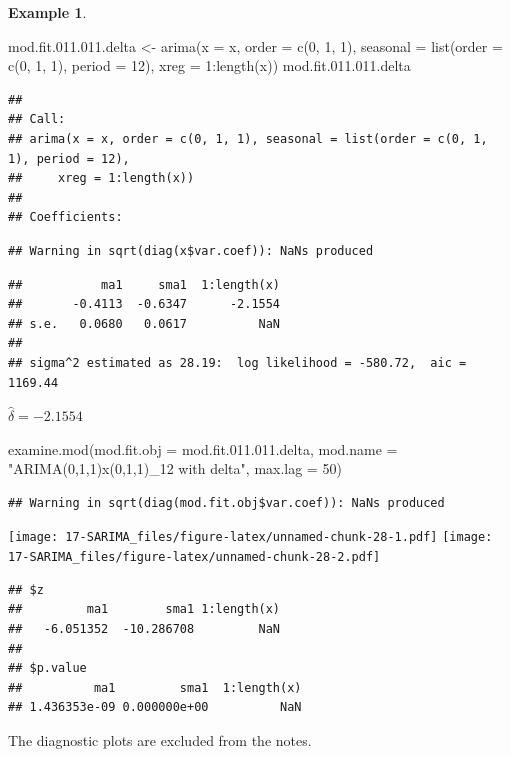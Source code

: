 \documentclass[
]{book}
\newenvironment{Shaded}{\begin{snugshade}}{\end{snugshade}}
\newcommand{\AttributeTok}[1]{\textcolor[rgb]{0.77,0.63,0.00}{#1}}
\newcommand{\DecValTok}[1]{\textcolor[rgb]{0.00,0.00,0.81}{#1}}
\newcommand{\FloatTok}[1]{\textcolor[rgb]{0.00,0.00,0.81}{#1}}
\newcommand{\FunctionTok}[1]{\textcolor[rgb]{0.00,0.00,0.00}{#1}}
\newcommand{\NormalTok}[1]{#1}
\newcommand{\OtherTok}[1]{\textcolor[rgb]{0.56,0.35,0.01}{#1}}
\newcommand{\SpecialCharTok}[1]{\textcolor[rgb]{0.00,0.00,0.00}{#1}}
\newcommand{\StringTok}[1]{\textcolor[rgb]{0.31,0.60,0.02}{#1}}
\theoremstyle{definition}
\theoremstyle{definition}
\newtheorem{example}{Example}[chapter]
\theoremstyle{definition}
\theoremstyle{definition}
\theoremstyle{remark}
\begin{document}
\begin{example}
\begin{Shaded}
\begin{Highlighting}[]
\NormalTok{mod.fit.}\DecValTok{011}\NormalTok{.}\FloatTok{011.}\NormalTok{delta }\OtherTok{\textless{}{-}} \FunctionTok{arima}\NormalTok{(}\AttributeTok{x =}\NormalTok{ x, }\AttributeTok{order =} \FunctionTok{c}\NormalTok{(}\DecValTok{0}\NormalTok{, }\DecValTok{1}\NormalTok{, }\DecValTok{1}\NormalTok{), }
   \AttributeTok{seasonal =} \FunctionTok{list}\NormalTok{(}\AttributeTok{order =} \FunctionTok{c}\NormalTok{(}\DecValTok{0}\NormalTok{, }\DecValTok{1}\NormalTok{, }\DecValTok{1}\NormalTok{), }\AttributeTok{period =} \DecValTok{12}\NormalTok{), }
   \AttributeTok{xreg =} \DecValTok{1}\SpecialCharTok{:}\FunctionTok{length}\NormalTok{(x))}
\NormalTok{mod.fit.}\DecValTok{011}\NormalTok{.}\FloatTok{011.}\NormalTok{delta }
\end{Highlighting}
\end{Shaded}

\begin{verbatim}
## 
## Call:
## arima(x = x, order = c(0, 1, 1), seasonal = list(order = c(0, 1, 1), period = 12), 
##     xreg = 1:length(x))
## 
## Coefficients:
\end{verbatim}

\begin{verbatim}
## Warning in sqrt(diag(x$var.coef)): NaNs produced
\end{verbatim}

\begin{verbatim}
##           ma1     sma1  1:length(x)
##       -0.4113  -0.6347      -2.1554
## s.e.   0.0680   0.0617          NaN
## 
## sigma^2 estimated as 28.19:  log likelihood = -580.72,  aic = 1169.44
\end{verbatim}

\(\hat \delta=-2.1554\)

\begin{Shaded}
\begin{Highlighting}[]
\FunctionTok{examine.mod}\NormalTok{(}\AttributeTok{mod.fit.obj =}\NormalTok{ mod.fit.}\DecValTok{011}\NormalTok{.}\FloatTok{011.}\NormalTok{delta, }
    \AttributeTok{mod.name =} \StringTok{"ARIMA(0,1,1)x(0,1,1)\_12 with delta"}\NormalTok{, }
    \AttributeTok{max.lag =} \DecValTok{50}\NormalTok{)}
\end{Highlighting}
\end{Shaded}

\begin{verbatim}
## Warning in sqrt(diag(mod.fit.obj$var.coef)): NaNs produced
\end{verbatim}

\texttt{[image: 17-SARIMA\_files/figure-latex/unnamed-chunk-28-1.pdf]} \texttt{[image: 17-SARIMA\_files/figure-latex/unnamed-chunk-28-2.pdf]}

\begin{verbatim}
## $z
##         ma1        sma1 1:length(x) 
##   -6.051352  -10.286708         NaN 
## 
## $p.value
##          ma1         sma1  1:length(x) 
## 1.436353e-09 0.000000e+00          NaN
\end{verbatim}

The diagnostic plots are excluded from the notes.
\end{example}
\end{document}
